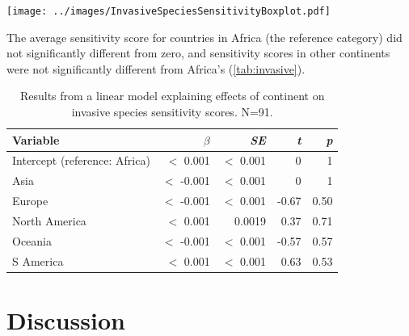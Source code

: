 \documentclass[11pt, a4paper, titlepage]{article}
\begin{document}
	\texttt{[image: ../images/InvasiveSpeciesSensitivityBoxplot.pdf]}
	\label{invasivebox}

    The average sensitivity score for countries in Africa (the reference category) did not significantly different from zero, and sensitivity scores in other continents were not significantly different from Africa's (\autoref{tab:invasive}).
	\begin{table}[h!]
		\begin{center}
			\caption{Results from a linear model explaining effects of continent on invasive species sensitivity scores.\textmd{ N=91.}}
			\label{tab:invasive}
			\begin{tabular}{l|r|r|r|r} %
				Variable & $\beta$ & \textit{SE} & \textit{t} & \textit{p}\\
				\hline
				Intercept (reference: Africa) & $<$ 0.001 & $<$ 0.001 & 0 & 1\\
				Asia & $<$ -0.001 & $<$ 0.001 & 0 & 1\\
				Europe & $<$ -0.001 & $<$ 0.001 & -0.67 & 0.50 \\
				North America & $<$ 0.001 & 0.0019 & 0.37 & 0.71\\
				Oceania & $<$ -0.001 & $<$ 0.001 & -0.57 & 0.57\\
				S America & $<$ 0.001 & $<$ 0.001 & 0.63 & 0.53\\
				
			\end{tabular}
		\end{center}
	\end{table}

    \clearpage
    
     \section*{Discussion}
\end{document}
